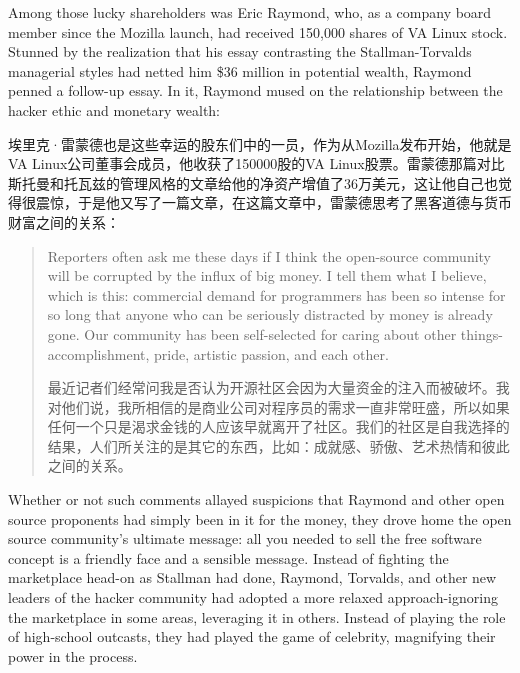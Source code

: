 \ifdefined\eng
Among those lucky shareholders was Eric Raymond, who, as a company board member since the Mozilla launch, had received 150,000 shares of VA Linux stock. Stunned by the realization that his essay contrasting the Stallman-Torvalds managerial styles had netted him \$36 million in potential wealth, Raymond penned a follow-up essay. In it, Raymond mused on the relationship between the hacker ethic and monetary wealth:
\fi

\ifdefined\chs
埃里克·雷蒙德也是这些幸运的股东们中的一员，作为从Mozilla发布开始，他就是VA Linux公司董事会成员，他收获了150000股的VA Linux股票。雷蒙德那篇对比斯托曼和托瓦兹的管理风格的文章给他的净资产增值了36万美元，这让他自己也觉得很震惊，于是他又写了一篇文章，在这篇文章中，雷蒙德思考了黑客道德与货币财富之间的关系：
\fi

\begin{quote}
\ifdefined\eng
Reporters often ask me these days if I think the open-source community will be corrupted by the influx of big money. I tell them what I believe, which is this: commercial demand for programmers has been so intense for so long that anyone who can be seriously distracted by money is already gone. Our community has been self-selected for caring about other things-accomplishment, pride, artistic passion, and each other.
\fi

\ifdefined\chs
最近记者们经常问我是否认为开源社区会因为大量资金的注入而被破坏。我对他们说，我所相信的是商业公司对程序员的需求一直非常旺盛，所以如果任何一个只是渴求金钱的人应该早就离开了社区。我们的社区是自我选择的结果，人们所关注的是其它的东西，比如：成就感、骄傲、艺术热情和彼此之间的关系。
\fi
\end{quote}

\ifdefined\eng
Whether or not such comments allayed suspicions that Raymond and other open source proponents had simply been in it for the money, they drove home the open source community's ultimate message: all you needed to sell the free software concept is a friendly face and a sensible message. Instead of fighting the marketplace head-on as Stallman had done, Raymond, Torvalds, and other new leaders of the hacker community had adopted a more relaxed approach-ignoring the marketplace in some areas, leveraging it in others. Instead of playing the role of high-school outcasts, they had played the game of celebrity, magnifying their power in the process.
\fi


